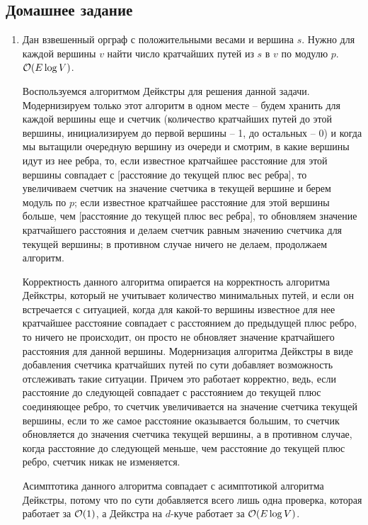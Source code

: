 \subsection{Домашнее задание}
\begin{enumerate}
  \item
    Дан взвешенный орграф с положительными весами и вершина $s$.
    Нужно для каждой вершины $v$ найти число кратчайших путей из $s$ в $v$ по модулю $p$. $\mathcal{O}(E \log V)$.
    \begin{solution}
      Воспользуемся алгоритмом Дейкстры для решения данной задачи. Модернизируем только этот алгоритм в одном месте -- будем хранить для каждой вершины еще и счетчик (количество кратчайших путей до этой вершины, инициализируем до первой вершины -- 1, до остальных -- 0) и когда мы вытащили очередную вершину из очереди и смотрим, в какие вершины идут из нее ребра, то, если известное кратчайшее расстояние для этой вершины совпадает с [расстояние до текущей плюс вес ребра], то увеличиваем счетчик на значение счетчика в текущей вершине и берем модуль по $p$; если известное кратчайшее расстояние для этой вершины больше, чем [расстояние до текущей плюс вес ребра], то обновляем значение кратчайшего расстояния и делаем счетчик равным значению счетчика для текущей вершины; в противном случае ничего не делаем, продолжаем алгоритм.

      Корректность данного алгоритма опирается на корректность алгоритма Дейкстры, который не учитывает количество минимальных путей, и если он встречается с ситуацией, когда для какой-то вершины известное для нее кратчайшее расстояние совпадает с расстоянием до предыдущей плюс ребро, то ничего не происходит, он просто не обновляет значение кратчайшего расстояния для данной вершины. Модернизация алгоритма Дейкстры в виде добавления счетчика кратчайших путей по сути добавляет возможность отслеживать такие ситуации. Причем это работает корректно, ведь, если расстояние до следующей совпадает с расстоянием до текущей плюс соединяющее ребро, то счетчик увеличивается на значение счетчика текущей вершины, если то же самое расстояние оказывается большим, то счетчик обновляется до значения счетчика текущей вершины, а в противном случае, когда расстояние до следующей меньше, чем расстояние до текущей плюс ребро, счетчик никак не изменяется.

      Асимптотика данного алгоритма совпадает с асимптотикой алгоритма Дейкстры, потому что по сути добавляется всего лишь одна проверка, которая работает за $\mathcal{O}(1)$, а Дейкстра на $d$-куче работает за $\mathcal{O}(E \log V)$.
    \end{solution}


\end{enumerate}
